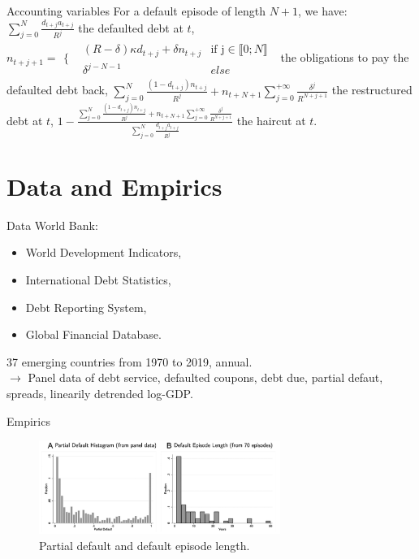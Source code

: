 \documentclass{beamer}
\begin{document}
\begin{frame}{Accounting variables}
For a default episode of length \(N+1\), we have:
\bigbreak
\(\sum_{j=0}^{N} \frac{d_{t+j}a_{t+j}}{R^j}\) the defaulted debt at \(t\),
\bigbreak
\(
n_{t+j+1}=
\begin{array}{cc}
  \Biggl\{ & 
    \begin{array}{cc}
      (R-\delta)\kappa d_{t+j}+\delta n_{t+j} & \text{if j} \in \llbracket 0;N \rrbracket \\
      \delta^{j-N-1} & else
    \end{array}
\end{array}
\)
the obligations to pay the defaulted debt back,
\bigbreak
\(\sum_{j=0}^{N}\frac{(1-d_{t+j})n_{t+j}}{R^j}+n_{t+N+1}\sum_{j=0}^{+\infty}\frac{\delta^j}{R^{N+j+1}}\) the restructured debt at \(t\),
\(1-\frac{\sum_{j=0}^{N}\frac{(1-d_{t+j})n_{t+j}}{R^j}+n_{t+N+1}\sum_{j=0}^{+\infty}\frac{\delta^j}{R^{N+j+1}}}{\sum_{j=0}^{N} \frac{d_{t+j}a_{t+j}}{R^j}}\) the haircut at \(t\).

\end{frame}





\section{Data and Empirics}

\begin{frame}{Data}
    World Bank:
        \begin{itemize}
            \item World Development Indicators,
            \item International Debt Statistics,
            \item Debt Reporting System,
            \item Global Financial Database.
        \end{itemize}
    37 emerging countries from 1970 to 2019, annual.
    \\\bigbreak
    \(\longrightarrow\) Panel data of debt service, defaulted coupons, debt due, partial defaut, spreads, linearily detrended log-GDP.
    
    \end{frame}    

\begin{frame}{Empirics}

\begin{figure}
\includegraphics[width=0.7\textwidth]{../outputs/fig_2.png}
\caption{Partial default and default episode length.}
\end{figure}


\end{frame}
\end{document}
